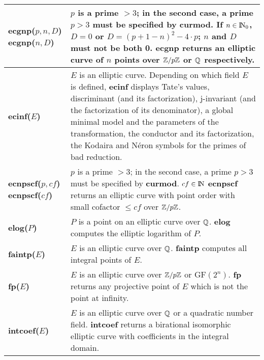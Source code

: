 {\begin{tabular}{|p{1.95in}|p{3.83in}|} \hline

{\bf ecgnp($p, n, D$)\newline
ecgnp($n, D$)} &
$p$ is a prime $> 3$; in the second case, a prime $p > 3$ must
be specified by {\bf curmod}. If $n \in {\rm{I\!N}}_0$, $D = 0$ or\newline
$D  = (p + 1 - n)^2 - 4 \cdot p$; $n$ and $D$ must not be both 0.\newline
{\bf ecgnp} returns an elliptic curve of $n$ points over $\mbox{$\mathbb Z$}/p\mbox{$\mathbb Z$}$ or $\mbox{$\mathbb Q$}$
respectively.\\ \hline

{\bf ecinf($E$) } &
$E$ is an elliptic curve.\newline
Depending on which field $E$ is defined, {\bf ecinf} displays
Tate's values, discriminant (and its factorization), \newline
j-invariant (and the factorization of its denominator), a global
minimal model and the parameters of the transformation, the conductor
and its factorization, the Kodaira and N\'eron symbols for the primes
of bad reduction.\\ \hline

{\bf ecnpscf($p, cf$)\newline
ecnpscf($cf$)} &
$p$ is a prime $> 3$; in the second case, a prime $p > 3$ must
be specified by {\bf curmod}. $cf \in {\rm{I\!N}}$\newline
{\bf ecnpscf} returns an elliptic curve with point order with small 
cofactor $\leq cf$ over $\mbox{$\mathbb Z$}/p\mbox{$\mathbb Z$}$. \\ \hline

{\bf elog($P$)} &
$P$ is a point on an elliptic curve over $\mbox{$\mathbb Q$}$.\newline
{\bf elog} computes the elliptic logarithm of $P$. \\ \hline

{\bf faintp($E$)} &
$E$ is an elliptic curve over $\mbox{$\mathbb Q$}$.\newline
{\bf faintp} computes all integral points of $E$. \\ \hline

{\bf fp($E$)} &
$E$ is an elliptic curve over $\mbox{$\mathbb Z$}/p\mbox{$\mathbb Z$}$ or GF$(2^n)$.\newline
{\bf fp} returns any projective point of $E$ which is not the point at
infinity.\\ \hline

{\bf intcoef($E$) } &
$E$ is an elliptic curve over $\mbox{$\mathbb Q$}$ or a quadratic number field.\newline
{\bf intcoef} returns a birational isomorphic elliptic curve  with coefficients
in the integral domain.\\ \hline


\end{tabular}}
